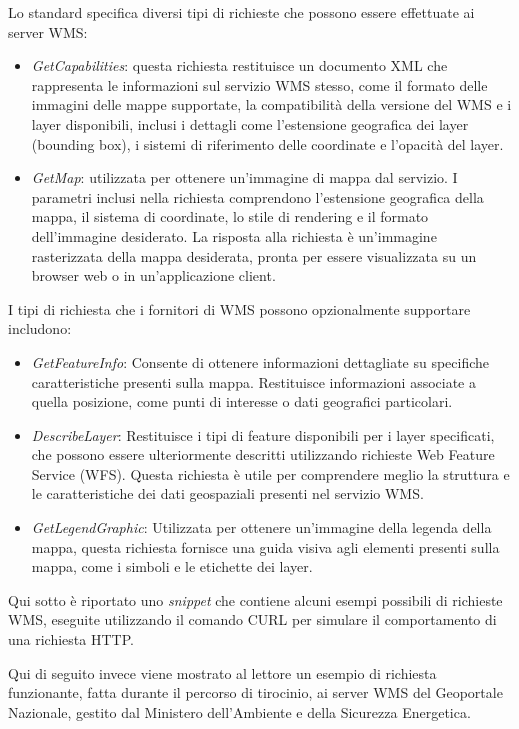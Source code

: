 Lo standard specifica diversi tipi di richieste che possono essere effettuate ai server WMS:
\begin{itemize}
      \item \textit{GetCapabilities}: questa richiesta restituisce un documento XML che rappresenta le informazioni sul servizio WMS stesso, come il formato delle immagini delle mappe supportate, la compatibilità della versione del WMS e i layer disponibili, inclusi i dettagli come l'estensione geografica dei layer (bounding box), i sistemi di riferimento delle coordinate e l'opacità del layer.
      \item \textit{GetMap}: utilizzata per ottenere un'immagine di mappa dal servizio. I parametri inclusi nella richiesta comprendono l'estensione geografica della mappa, il sistema di coordinate, lo stile di rendering e il formato dell'immagine desiderato. La risposta alla richiesta è un'immagine rasterizzata della mappa desiderata, pronta per essere visualizzata su un browser web o in un'applicazione client.
\end{itemize}
I tipi di richiesta che i fornitori di WMS possono opzionalmente supportare includono:
\begin{itemize}
      \item \textit{GetFeatureInfo}: Consente di ottenere informazioni dettagliate su specifiche caratteristiche presenti sulla mappa. Restituisce informazioni associate a quella posizione, come punti di interesse o dati geografici particolari.
      \item \textit{DescribeLayer}: Restituisce i tipi di feature disponibili per i layer specificati, che possono essere ulteriormente descritti utilizzando richieste Web Feature Service (WFS). Questa richiesta è utile per comprendere meglio la struttura e le caratteristiche dei dati geospaziali presenti nel servizio WMS.
      \item \textit{GetLegendGraphic}: Utilizzata per ottenere un'immagine della legenda della mappa, questa richiesta fornisce una guida visiva agli elementi presenti sulla mappa, come i simboli e le etichette dei layer.
\end{itemize}
Qui sotto è riportato uno \textit{snippet} che contiene alcuni esempi possibili di richieste WMS, eseguite utilizzando il comando CURL per simulare il comportamento di una richiesta HTTP.

Qui di seguito invece viene mostrato al lettore un esempio di richiesta funzionante, fatta durante il percorso di tirocinio, ai server WMS del Geoportale Nazionale, gestito dal Ministero dell'Ambiente e della Sicurezza Energetica.
